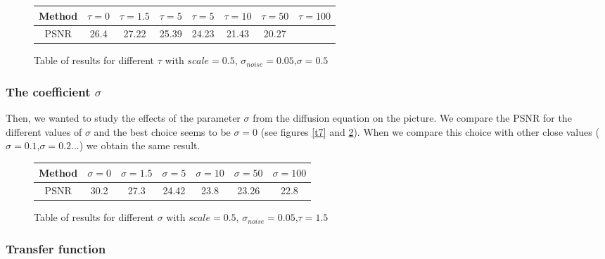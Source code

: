 \documentclass{report}
\begin{document}
        \begin{figure}[h!]
        \label{T6}
        \centering
         \caption{Table of results for different $\tau$ with $scale=0.5$, $\sigma_{noise}=0.05$,$\sigma=0.5$ }
        \begin{tabular}{|c|c|c|c|c|c|c|c|}
        \hline
        Method & $\tau=0$ & $\tau=1.5$ & $\tau=5$ & $\tau=5$ & $\tau=10$ & $\tau=50$ & $\tau=100$
        \\ \hline
         PSNR  & 26.4 & 27.22 & 25.39 & 24.23 & 21.43 & 20.27 \\
         \hline
        \end{tabular}
        \end{figure}






\subsubsection{The coefficient $\sigma$}

Then, we wanted to study the effects of the parameter $\sigma$ from the diffusion equation on the picture. We compare the PSNR for the different values of $\sigma$ and the best choice seems to be $\sigma=0$ (see figures \ref{t7} and \ref{T7}). When we compare this choice with other close values ($\sigma=0.1$,$\sigma=0.2$...) we obtain the same result. 


       



 \begin{figure}[h!]
        \centering
        \label{T7}
         \caption{Table of results for different $\sigma$ with $scale=0.5$, $\sigma_{noise}=0.05$,$\tau=1.5$}
        \begin{tabular}{|c|c|c|c|c|c|c|}
        \hline
        Method & $\sigma=0$ & $\sigma=1.5$ & $\sigma=5$ & $\sigma=10$ & $\sigma=50$ & $\sigma=100$ \\
        \hline
        PSNR  & 30.2 & 27.3 & 24.42 & 23.8 & 23.26 & 22.8 \\
        \hline
        \end{tabular}
        \end{figure}







\subsubsection{Transfer function}
\end{document}
